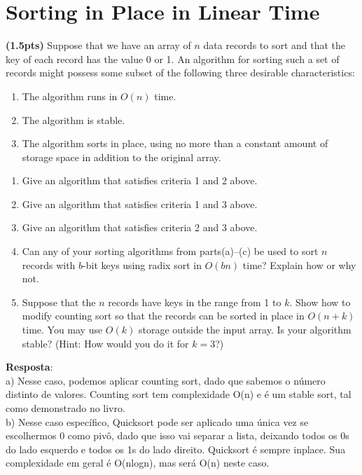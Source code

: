 \documentclass{article}
\begin{document}
\section{Sorting in Place in Linear Time}
\textbf{(1.5pts)} Suppose that we have an array of $n$ data records to sort and that the key of each record has the value 0 or 1. An algorithm for sorting such a set of records might possess some subset of the following three desirable characteristics:

\begin{enumerate}
  \item The algorithm runs in $O(n)$ time.
  \item The algorithm is stable.
  \item The algorithm sorts in place, using no more than a constant amount of storage space in addition to the original array.
\end{enumerate}

\begin{enumerate}[label=(\alph*)]
  \item Give an algorithm that satisfies criteria 1 and 2 above.
  \item Give an algorithm that satisfies criteria 1 and 3 above.
  \item Give an algorithm that satisfies criteria 2 and 3 above.
  \item Can any of your sorting algorithms from parts(a)–(c) be used to sort $n$ records with $b$-bit keys using radix sort in $O(bn)$ time? Explain how or why not.
  \item Suppose that the $n$ records have keys in the range from 1 to $k$. Show how to modify counting sort so that the records can be sorted in place in $O(n + k)$ time. You may use $O(k)$ storage outside the input array. Is your algorithm stable? (Hint: How would you do it for $k = 3$?)

\end{enumerate}

\textbf{Resposta}:\\

a) Nesse caso, podemos aplicar counting sort, dado que sabemos o número distinto de valores. Counting sort tem complexidade O(n) e é um stable sort, tal como demonstrado no livro.\\

b) Nesse caso específico, Quicksort pode ser aplicado uma única vez se escolhermos 0 como pivô, dado que isso vai separar a lista, deixando todos os 0s do lado esquerdo e todos os 1s do lado direito. Quicksort é sempre inplace. Sua complexidade em geral é O(nlogn), mas será O(n) neste caso. \\
\end{document}
